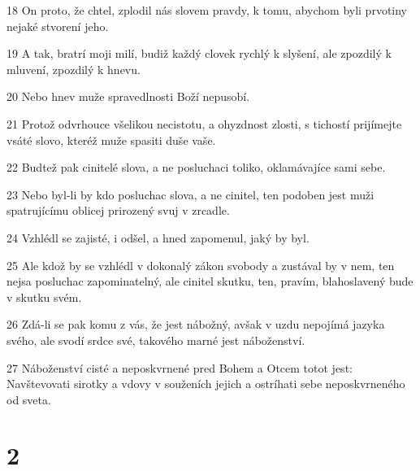 \par 18 On proto, že chtel, zplodil nás slovem pravdy, k tomu, abychom byli prvotiny nejaké stvorení jeho.
\par 19 A tak, bratrí moji milí, budiž každý clovek rychlý k slyšení, ale zpozdilý k mluvení, zpozdilý k hnevu.
\par 20 Nebo hnev muže spravedlnosti Boží nepusobí.
\par 21 Protož odvrhouce všelikou necistotu, a ohyzdnost zlosti, s tichostí prijímejte vsáté slovo, kteréž muže spasiti duše vaše.
\par 22 Budtež pak cinitelé slova, a ne posluchaci toliko, oklamávajíce sami sebe.
\par 23 Nebo byl-li by kdo posluchac slova, a ne cinitel, ten podoben jest muži spatrujícímu oblicej prirozený svuj v zrcadle.
\par 24 Vzhlédl se zajisté, i odšel, a hned zapomenul, jaký by byl.
\par 25 Ale kdož by se vzhlédl v dokonalý zákon svobody a zustával by v nem, ten nejsa posluchac zapominatelný, ale cinitel skutku, ten, pravím, blahoslavený bude v skutku svém.
\par 26 Zdá-li se pak komu z vás, že jest nábožný, avšak v uzdu nepojímá jazyka svého, ale svodí srdce své, takového marné jest náboženství.
\par 27 Náboženství cisté a neposkvrnené pred Bohem a Otcem totot jest: Navštevovati sirotky a vdovy v souženích jejich a ostríhati sebe neposkvrneného od sveta.

\chapter{2}


